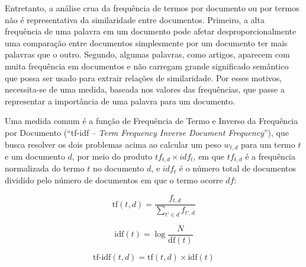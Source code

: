 \documentclass[
	12pt,				%
	openright,			%
	oneside,			%
	a4paper,			%
	english,			%
	french,				%
	spanish,			%
	brazil				%
	]{abntex2}
\begin{document}

Entretanto, a análise crua da frequência de termos por documento ou por termos não é representativa da similaridade
entre documentos. %
Primeiro, a alta frequência de uma palavra em um documento pode afetar desproporcionalmente uma comparação entre documentos
simplesmente por um documento ter mais palavras que o outro.
Segundo, algumas palavras, como artigos, aparecem com muita frequência em documentos e não
carregam grande significado semântico que possa ser usado para extrair relações de similaridade.
Por esses motivos, necessita-se de uma medida, baseada nos valores das frequências, que passe a representar
a importância de uma palavra para um documento.

Uma medida comum é a função de Frequência de Termo e Inverso da Frequência por Documento (``tf-idf -- \textit{Term Frequency Inverse Document Frequency}''), que busca resolver os dois problemas acima ao
calcular um peso $w_{t,d}$ para um termo $t$ e um documento $d$, por meio do produto $tf_{t,d} \times idf_{t}$, em que $tf_{t,d}$ é
a frequência normalizada do termo $t$ no documento $d$, e $idf_{t}$ é o número total de documentos dividido pelo número de documentos em que o termo ocorre $df$:

\begin{equation}
\text{tf}(t, d) = \frac{f_{t, d}}{\sum_{t' \in d} f_{t', d}}
\label{eq:tf}
\end{equation}

\begin{equation}
\text{idf}(t) = \log \frac{N}{\text{df}(t)}
\label{eq:idf}
\end{equation}

\begin{equation}
\text{tf-idf}(t, d) = \text{tf}(t, d) \times \text{idf}(t)
\label{eq:tfidf1}
\end{equation}
\end{document}
